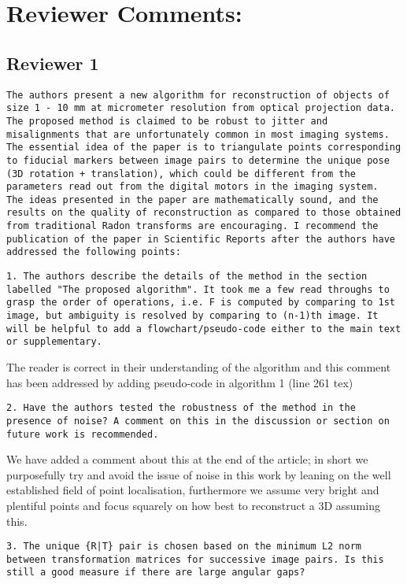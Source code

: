 \documentclass[12pt]{report}
\begin{document}
\section*{Reviewer Comments:}

\subsection*{Reviewer 1}
\begin{lstlisting}
The authors present a new algorithm for reconstruction of objects of size 1 - 10 mm at micrometer resolution from optical projection data. The proposed method is claimed to be robust to jitter and misalignments that are unfortunately common in most imaging systems. The essential idea of the paper is to triangulate points corresponding to fiducial markers between image pairs to determine the unique pose (3D rotation + translation), which could be different from the parameters read out from the digital motors in the imaging system.  The ideas presented in the paper are mathematically sound, and the results on the quality of reconstruction as compared to those obtained from traditional Radon transforms are encouraging. I recommend the publication of the paper in Scientific Reports after the authors have addressed the following points:
\end{lstlisting}
\begin{lstlisting}
1. The authors describe the details of the method in the section labelled "The proposed algorithm". It took me a few read throughs to grasp the order of operations, i.e. F is computed by comparing to 1st image, but ambiguity is resolved by comparing to (n-1)th image. It will be helpful to add a flowchart/pseudo-code either to the main text or supplementary.
\end{lstlisting}
The reader is correct in their understanding of the algorithm and this comment has been addressed by adding pseudo-code in algorithm 1 (line 261 tex)

\begin{lstlisting}
2. Have the authors tested the robustness of the method in the presence of noise? A comment on this in the discussion or section on future work is recommended.
\end{lstlisting}

We have added a comment about this at the end of the article; in short we purposefully try and avoid the issue of noise in this work by leaning on the well established field of point localisation, furthermore we assume very bright and plentiful points and focus squarely on how best to reconstruct a 3D assuming this.
\begin{lstlisting}
3. The unique {R|T} pair is chosen based on the minimum L2 norm between transformation matrices for successive image pairs. Is this still a good measure if there are large angular gaps?
\end{lstlisting}
\end{document}
